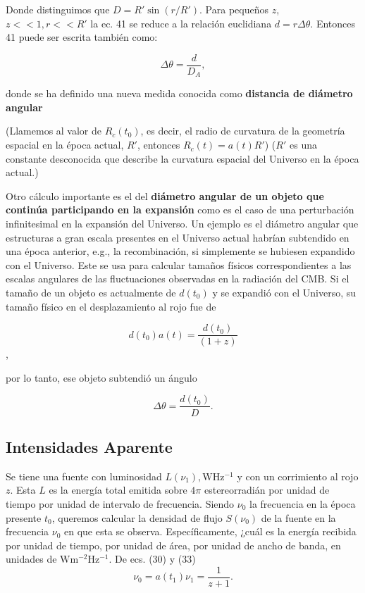\documentclass[11pt]{article}
\begin{document}
Donde distinguimos que $D = R' \sin(r/R')$. Para pequeños $z$, $z << 1, r <<R'$ la ec. 41 se reduce a la relación euclidiana $d = r \Delta \theta$. Entonces 41 puede ser escrita también como:

    \begin{equation}
        \Delta \theta = \frac{d}{D_A},
    \end{equation}

donde se ha definido una nueva medida conocida como {\bf{distancia de diámetro angular}}

(Llamemos al valor de $ R_c (t_0) $, es decir, el radio de curvatura de la geometría espacial en la época actual, $ R '$, entonces $R_c(t)= a(t) R'$)
($R'$ es una constante desconocida que describe la curvatura espacial del Universo en la época actual.)

Otro cálculo importante es el del {\bf{diámetro angular de un objeto que continúa participando en la expansión}} como es el caso de una perturbación infinitesimal en la expansión del Universo. Un ejemplo es el diámetro angular que estructuras a gran escala presentes en el Universo actual habrían subtendido en una época anterior, e.g., la recombinación, si simplemente se hubiesen expandido con el Universo. Este se usa para calcular tamaños físicos correspondientes a las escalas angulares de las fluctuaciones observadas en la radiación del CMB. Si el tamaño de un objeto es actualmente de $d(t_0)$ y se expandió con el Universo, su tamaño físico en el desplazamiento al rojo fue de

    $$d(t_0) a(t)=  \frac{d(t_0)}{(1+z)}$$,

por lo tanto, ese objeto subtendió un ángulo

    \begin{equation}
        \Delta \theta = \frac{d(t_0)}{D}.
    \end{equation}

\subsection{Intensidades Aparente}

Se tiene una fuente con luminosidad $L(\nu_1), \mathrm{W Hz^{-1}}$ y con un corrimiento al rojo $z$. Esta $L$ es la energía total emitida sobre $4 \pi$ estereorradián por unidad de tiempo por unidad de intervalo de frecuencia. Siendo $\nu_0$ la frecuencia en la época presente $t_0$, queremos calcular la densidad de flujo $S(\nu_0)$ de la fuente en la frecuencia $\nu_0$ en que esta se observa. Específicamente, ¿cuál es la energía recibida por unidad de tiempo, por unidad de área, por unidad de ancho de banda, en unidades de $\mathrm{W m^{-2} Hz^{-1}}$. De ecs. (30) y (33) 
    $$\nu_0 = a(t_1) \nu_1 = \frac{1}{z+1}.$$
\end{document}
